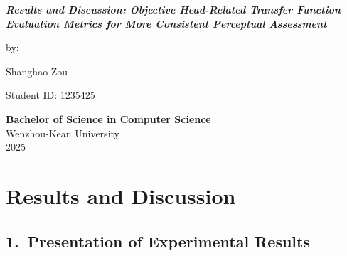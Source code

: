 \documentclass[12pt,a4paper]{article}
\begin{document}
\thispagestyle{empty}

\vspace*{2cm}

\begin{center}
{\LARGE \textbf{\textit{Results and Discussion: Objective Head-Related Transfer Function Evaluation Metrics for More Consistent Perceptual Assessment}}}
\end{center}

\vspace{1cm}

\begin{center}
by:
\end{center}

\vspace{0.5cm}

\begin{center}
{\large Shanghao Zou}
\end{center}

\vspace{0.3cm}

\begin{center}
Student ID: 1235425
\end{center}

\vspace{0.5cm}

\begin{center}
{\large \textbf{Bachelor of Science in Computer Science}}\\[0.3cm]
Wenzhou-Kean University\\[0.3cm]
2025
\end{center}

\newpage
{}


\section*{Results and Discussion}

\subsection*{1.\ Presentation of Experimental Results}
\end{document}
